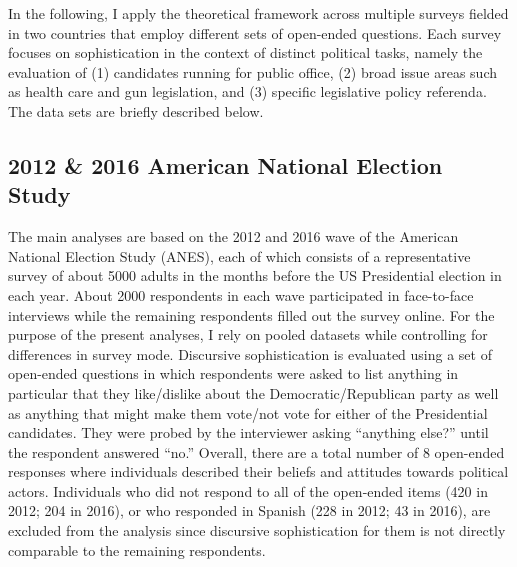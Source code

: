 In the following, I apply the theoretical framework across multiple surveys fielded in two countries that employ different sets of open-ended questions. Each survey focuses on sophistication in the context of distinct political tasks, namely the evaluation of (1) candidates running for public office, (2) broad issue areas such as health care and gun legislation, and (3) specific legislative policy referenda. The data sets are briefly described below.


\subsection*{2012 \& 2016 American National Election Study}
The main analyses are based on the 2012 and 2016 wave of the American National Election Study (ANES), each of which consists of a representative survey of about 5000 adults in the months before the US Presidential election in each year. About 2000 respondents in each wave participated in face-to-face interviews while the remaining respondents filled out the survey online. For the purpose of the present analyses, I rely on pooled datasets while controlling for differences in survey mode. Discursive sophistication is evaluated using a set of open-ended questions in which respondents were asked to list anything in particular that they like/dislike about the Democratic/Republican party as well as anything that might make them vote/not vote for either of the Presidential candidates. They were probed by the interviewer asking ``anything else?'' until the respondent answered ``no.'' Overall, there are a total number of 8 open-ended responses where individuals described their beliefs and attitudes towards political actors. Individuals who did not respond to all of the open-ended items (420 in 2012; 204 in 2016), or who responded in Spanish (228 in 2012; 43 in 2016), are excluded from the analysis since discursive sophistication for them is not directly comparable to the remaining respondents.


